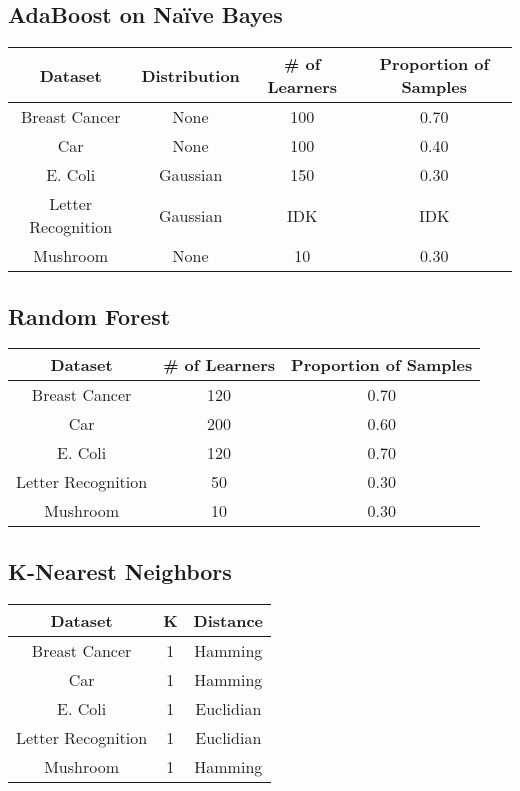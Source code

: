 \documentclass[11pt]{article}
\newcommand{\bb}{\textbf}
\begin{document}
\subsection{AdaBoost on Naïve Bayes}
\begin{tabular}{ |c|c|c|c| } \hline
  \bb{Dataset}       & \bb{Distribution} & \bb{\# of Learners} & Proportion of Samples \\ \hline
  Breast Cancer      & None              & 100                 & 0.70                  \\ \hline
  Car                & None              & 100                 & 0.40                  \\ \hline
  E. Coli            & Gaussian          & 150                 & 0.30                  \\ \hline
  Letter Recognition & Gaussian          & IDK                 & IDK                   \\ \hline
  Mushroom           & None              & 10                  & 0.30                  \\ \hline
\end{tabular}

\subsection{Random Forest}
\begin{tabular}{ |c|c|c| } \hline
  \bb{Dataset}       & \bb{\# of Learners} & Proportion of Samples \\ \hline
  Breast Cancer      & 120                 & 0.70                  \\ \hline
  Car                & 200                 & 0.60                  \\ \hline
  E. Coli            & 120                 & 0.70                  \\ \hline
  Letter Recognition & 50                  & 0.30                  \\ \hline
  Mushroom           & 10                  & 0.30                  \\ \hline
\end{tabular}

\subsection{K-Nearest Neighbors}
\begin{tabular}{ |c|c|c| } \hline
  \bb{Dataset}       & \bb{K} & Distance  \\ \hline
  Breast Cancer      & 1      & Hamming   \\ \hline
  Car                & 1      & Hamming   \\ \hline
  E. Coli            & 1      & Euclidian \\ \hline
  Letter Recognition & 1      & Euclidian \\ \hline
  Mushroom           & 1      & Hamming   \\ \hline
\end{tabular}
\end{document}
